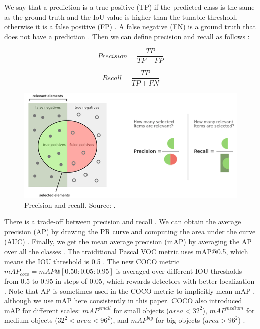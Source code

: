 \documentclass[a4paper, 11pt, oneside]{article}
\begin{document}
  We say that a prediction is a true positive (TP) if the predicted class is the same as the ground truth and the IoU
  value is higher than the tunable threshold, otherwise it is a false positive (FP)
  \cite{liu2020deep, elgendy2020deep, planche2019hands}. A false negative (FN) is a ground truth that does not have a
  prediction \cite{planche2019hands}. Then we can define precision and recall as follows
  \cite{burkov2019hundred, davis2006relationship}:

  $$Precision = \frac{TP}{TP + FP}$$

  $$Recall = \frac{TP}{TP + FN}$$

  \begin{figure}[ht]
    \begin{center}
      \includegraphics[width=\textwidth]{precision_recall.png}
    \end{center}
    \caption{Precision and recall. Source: \cite{precisionrecall}.}
  \end{figure}

  There is a trade-off between precision and recall
  \cite{elgendy2020deep, geron2019hands, burkov2019hundred, planche2019hands}. We can obtain the average precision
  (AP) by drawing the PR curve and computing the area under the curve (AUC) \cite{elgendy2020deep, planche2019hands}.
  Finally, we get the mean average precision (mAP) by averaging the AP over all the classes
  \cite{elgendy2020deep, geron2019hands, planche2019hands}. The traiditional Pascal VOC metric uses mAP@0.5, which means
  the IOU threshold is 0.5 \cite{liu2020deep, everingham2010pascal}. The new COCO metric $mAP_{coco} = mAP@[0.50:0.05:0.95]$
  is averaged over different IOU thresholds from 0.5 to 0.95 in steps of 0.05, which rewards detectors with better
  localization \cite{liu2020deep, cocometrics}. Note that AP is sometimes used in the COCO metric to implicitly mean mAP
  \cite{cocometrics}, although we use mAP here consistently in this paper. COCO also introduced mAP for different scales:
  $mAP^{small}$ for small objects ($area < 32^2$), $mAP^{medium}$ for medium objects ($32^2 < area < 96^2$),
  and $mAP^{big}$ for big objects ($area > 96^2$) \cite{liu2020deep, cocometrics}.
\end{document}
